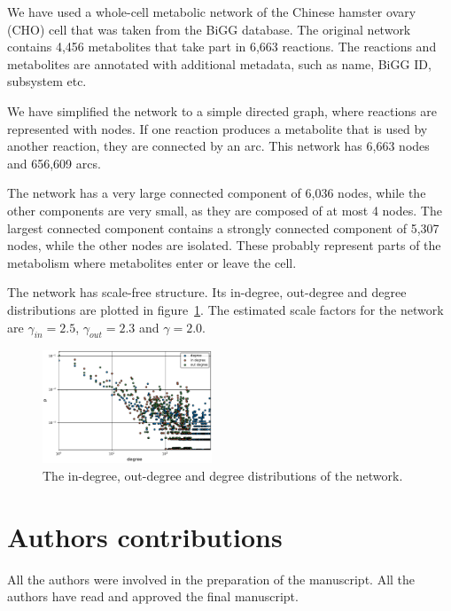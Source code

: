 We have used a whole-cell metabolic network of the Chinese hamster ovary (CHO)
cell that was taken from the BiGG database\cite{bigg,chocons}. The original
network contains 4,456 metabolites that take part in 6,663 reactions. The
reactions and metabolites are annotated with additional metadata, such as name,
BiGG ID, subsystem etc.

We have simplified the network to a simple directed graph, where reactions are
represented with nodes. If one reaction produces a metabolite that is used by
another reaction, they are connected by an arc. This network has 6,663 nodes and
656,609 arcs.

The network has a very large connected component of 6,036 nodes, while the other
components are very small, as they are composed of at most 4 nodes. The largest
connected component contains a strongly connected component of 5,307 nodes,
while the other nodes are isolated. These probably represent parts of the
metabolism where metabolites enter or leave the cell.

The network has scale-free structure. Its in-degree, out-degree and degree
distributions are plotted in figure~\ref{fig:dist}. The estimated scale factors
for the network are $\gamma_{in} = 2.5$, $\gamma_{out} = 2.3$ and $\gamma =
2.0$. %

\begin{figure}
  \includegraphics[width=0.45\textwidth]{../plots/degree}
  \caption{The in-degree, out-degree and degree distributions of the network.}
  \label{fig:dist}
\end{figure}

\section{Authors contributions}
All the authors were involved in the preparation of the manuscript.
All the authors have read and approved the final manuscript.

